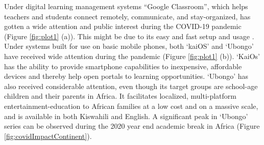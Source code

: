 \documentclass[11pt,a4paper,]{article}
\begin{document}
Under digital learning management systems ``Google Classroom'', which helps teachers and students connect remotely, communicate, and stay-organized, has gotten a wide attention and public interest during the COVID-19 pandemic (Figure \ref{fig:plot1} (a)). This might be due to its easy and fast setup and usage \autocite{sudarsana2019use}. Under systems built for use on basic mobile phones, both `kaiOS' and `Ubongo' have received wide attention during the pandemic (Figure \ref{fig:plot1} (b)).
`KaiOs' has the ability to provide smartphone capabilities to inexpensive, affordable devices and thereby help open portals to learning opportunities. `Ubongo' has also received considerable attention, even though its target groups are school-age children and their parents in Africa. It facilitates localized, multi-platform entertainment-education to African families at a low cost and on a massive scale, and is available in both Kiswahili and English. A significant peak in `Ubongo' series can be observed during the 2020 year end academic break in Africa (Figure \ref{fig:covidImpactContinent}).
\end{document}
